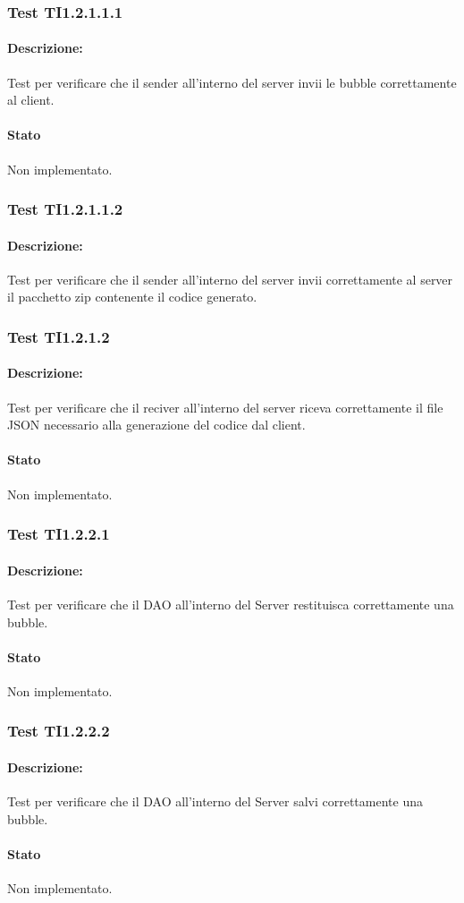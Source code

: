 \documentclass[../PianoDiQualifica.tex]{subfiles}
\begin{document}
	\subsubsection{Test TI1.2.1.1.1}
	\paragraph{Descrizione:} Test per verificare che il sender all'interno del server invii le bubble correttamente al client.
	\paragraph{Stato} Non implementato.
	
	\subsubsection{Test TI1.2.1.1.2}
	\paragraph{Descrizione:} Test per verificare che il sender all'interno del server invii  correttamente al server il pacchetto zip contenente il codice generato.
	\subsubsection{Test TI1.2.1.2}
	\paragraph{Descrizione:} Test per verificare che il reciver all'interno del server riceva correttamente il file JSON necessario alla generazione del codice dal client.
	\paragraph{Stato} Non implementato.
	\subsubsection{Test TI1.2.2.1}
	\paragraph{Descrizione:} Test per verificare che il DAO all'interno del Server restituisca correttamente una bubble.
	\paragraph{Stato} Non implementato.
	
	\subsubsection{Test TI1.2.2.2}
	\paragraph{Descrizione:} Test per verificare che il DAO all'interno del Server salvi correttamente una bubble.
	\paragraph{Stato} Non implementato.
\end{document}

